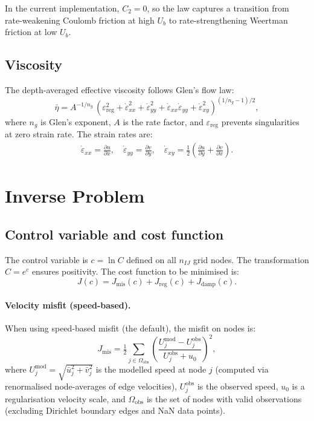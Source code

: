 \documentclass[a4paper,11pt,fleqn]{article}
\newcommand{\be}{\begin{equation}}
\newcommand{\ee}{\end{equation}}
\newcommand{\pd}[2]{\frac{\partial #1}{\partial #2}}
\newcommand{\eps}{\varepsilon}
\newcommand{\half}{\tfrac{1}{2}}
\begin{document}
In the current implementation, $C_2 = 0$, so the law captures a transition from rate-weakening Coulomb friction at high $U_b$ to rate-strengthening Weertman friction at low $U_b$.

\subsection{Viscosity}
\label{sec:viscosity}

The depth-averaged effective viscosity follows Glen's flow law:
\be
\label{eq:viscosity}
\bar\eta = A^{-1/n_g}\, \left(\eps_{\mathrm{reg}}^2 + \dot\eps_{xx}^2 + \dot\eps_{yy}^2 + \dot\eps_{xx}\dot\eps_{yy} + \dot\eps_{xy}^2\right)^{(1/n_g - 1)/2},
\ee
where $n_g$ is Glen's exponent, $A$ is the rate factor, and $\eps_{\mathrm{reg}}$ prevents singularities at zero strain rate. The strain rates are:
\begin{align}
    \dot\eps_{xx} = \pd{u}{x}, \quad
    \dot\eps_{yy} = \pd{v}{y}, \quad
    \dot\eps_{xy} = \half\left(\pd{u}{y} + \pd{v}{x}\right).
\end{align}

\section{Inverse Problem}
\label{sec:inverse}

\subsection{Control variable and cost function}

The control variable is $c = \ln C$ defined on all $n_{IJ}$ grid nodes. The transformation $C = e^c$ ensures positivity. The cost function to be minimised is:
\be
\label{eq:cost}
J(c) = J_{\mathrm{mis}}(c) + J_{\mathrm{reg}}(c) + J_{\mathrm{damp}}(c).
\ee

\paragraph{Velocity misfit (speed-based).}
When using speed-based misfit (the default), the misfit on nodes is:
\be
\label{eq:Jmis_speed}
J_{\mathrm{mis}} = \half \sum_{j \in \Omega_{\mathrm{obs}}} \left(\frac{U_j^{\mathrm{mod}} - U_j^{\mathrm{obs}}}{U_j^{\mathrm{obs}} + u_0}\right)^2,
\ee
where $U_j^{\mathrm{mod}} = \sqrt{\bar u_j^2 + \bar v_j^2}$ is the modelled speed at node $j$ (computed via renormalised node-averages of edge velocities), $U_j^{\mathrm{obs}}$ is the observed speed, $u_0$ is a regularisation velocity scale, and $\Omega_{\mathrm{obs}}$ is the set of nodes with valid observations (excluding Dirichlet boundary edges and NaN data points).
\end{document}
